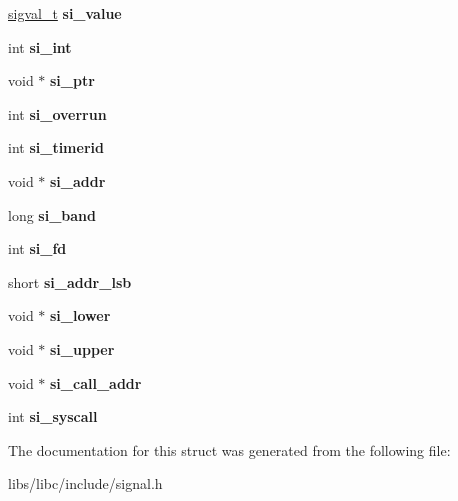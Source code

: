 \begin{DoxyCompactItemize}
\item 
\hyperlink{unionsigval__t}{sigval\+\_\+t} {\bfseries si\+\_\+value}\hypertarget{structsiginfo__t_a88814b6b581c31d219e594730c9f6408}{}\label{structsiginfo__t_a88814b6b581c31d219e594730c9f6408}

\item 
int {\bfseries si\+\_\+int}\hypertarget{structsiginfo__t_a83e2d76eaaa70cbd2b06a946192a830d}{}\label{structsiginfo__t_a83e2d76eaaa70cbd2b06a946192a830d}

\item 
void $\ast$ {\bfseries si\+\_\+ptr}\hypertarget{structsiginfo__t_af1e491d12591cb105e5e8a59aff33072}{}\label{structsiginfo__t_af1e491d12591cb105e5e8a59aff33072}

\item 
int {\bfseries si\+\_\+overrun}\hypertarget{structsiginfo__t_a1aa48e3053b8fe7223b011513f611443}{}\label{structsiginfo__t_a1aa48e3053b8fe7223b011513f611443}

\item 
int {\bfseries si\+\_\+timerid}\hypertarget{structsiginfo__t_a7c56d7ceaabb048675714bc1bee4567e}{}\label{structsiginfo__t_a7c56d7ceaabb048675714bc1bee4567e}

\item 
void $\ast$ {\bfseries si\+\_\+addr}\hypertarget{structsiginfo__t_ad1b72421321261362dfc00d180d8de69}{}\label{structsiginfo__t_ad1b72421321261362dfc00d180d8de69}

\item 
long {\bfseries si\+\_\+band}\hypertarget{structsiginfo__t_a6ce15e0f745b97a19ccbd075e9a6ce7d}{}\label{structsiginfo__t_a6ce15e0f745b97a19ccbd075e9a6ce7d}

\item 
int {\bfseries si\+\_\+fd}\hypertarget{structsiginfo__t_ade7676c770da2b60cfb0a0223621d87e}{}\label{structsiginfo__t_ade7676c770da2b60cfb0a0223621d87e}

\item 
short {\bfseries si\+\_\+addr\+\_\+lsb}\hypertarget{structsiginfo__t_a414b588c460e1c986b4467409cfdfd29}{}\label{structsiginfo__t_a414b588c460e1c986b4467409cfdfd29}

\item 
void $\ast$ {\bfseries si\+\_\+lower}\hypertarget{structsiginfo__t_a172b2b47df012b6e8584b765a96c7c94}{}\label{structsiginfo__t_a172b2b47df012b6e8584b765a96c7c94}

\item 
void $\ast$ {\bfseries si\+\_\+upper}\hypertarget{structsiginfo__t_a35cc14a1a11c2faff57a600ebc198627}{}\label{structsiginfo__t_a35cc14a1a11c2faff57a600ebc198627}

\item 
void $\ast$ {\bfseries si\+\_\+call\+\_\+addr}\hypertarget{structsiginfo__t_a90c347442f9f657dc3ac02669303ad7e}{}\label{structsiginfo__t_a90c347442f9f657dc3ac02669303ad7e}

\item 
int {\bfseries si\+\_\+syscall}\hypertarget{structsiginfo__t_a9f93f5721d59ada7d06764b0091eef1a}{}\label{structsiginfo__t_a9f93f5721d59ada7d06764b0091eef1a}

\end{DoxyCompactItemize}


The documentation for this struct was generated from the following file\+:\begin{DoxyCompactItemize}
\item 
libs/libc/include/signal.\+h\end{DoxyCompactItemize}
